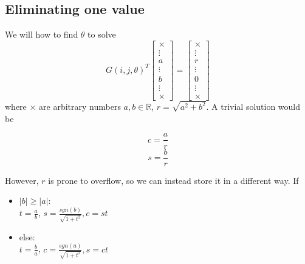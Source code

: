 \documentclass[a4paper]{scrartcl}
\begin{document}
    \subsection{Eliminating one value}
        We will how to find $\theta$ to solve
        \begin{equation}
            G(i,j,\theta)^T \begin{bmatrix} 
                \times\\
                \vdots\\
                a\\
                \vdots\\
                b\\
                \vdots\\
                \times
                \end{bmatrix}
            = \begin{bmatrix} 
                \times\\
                \vdots\\
                r\\
                \vdots\\
                0\\
                \vdots\\
                \times
                \end{bmatrix}
        \end{equation}
        where $\times$ are arbitrary numbers $a,b \in \mathbb{R}$, $r=\sqrt{a^2+b^2}$. 
        A trivial solution would be 
        \begin{multicols}{2}
            \begin{equation}
                c = \frac{a}{r}
            \end{equation}\break
            \begin{equation}
                s = \frac{b}{r}
            \end{equation}
          \end{multicols}
        However, $r$ is prone to overflow, so we can instead store it in a
        different way. If
        \begin{itemize}
            \item $\lvert b \rvert \geq \lvert a \rvert$:\\
                $t=\frac{a}{b}$, $s=\frac{sgn(b)}{\sqrt{1+t^2}}, c=st$
            \item else:\\
                $t=\frac{b}{a}$, $c=\frac{sgn(a)}{\sqrt{1+t^2}}, s=ct$
        \end{itemize}
\end{document}
